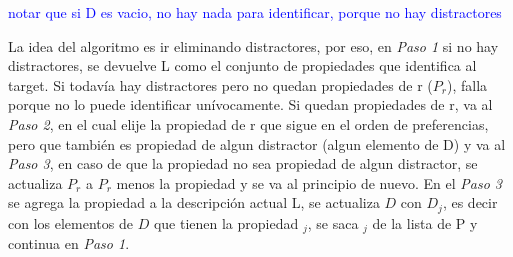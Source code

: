 \textcolor{blue}{notar que si D es vacio, no hay nada para identificar, porque no hay distractores}

La idea del algoritmo es ir eliminando distractores, por eso, en {\it Paso 1} si no hay distractores, se devuelve L como el conjunto de propiedades que identifica al target. Si todav\'ia hay distractores pero no quedan propiedades de r ($P_{r}$), falla porque no lo puede identificar un\'ivocamente. Si quedan propiedades de r, va al {\it Paso 2}, en el cual elije la propiedad de r que sigue en el orden de preferencias, pero que tambi\'en es propiedad de algun distractor (algun elemento de D) y va al {\it Paso 3}, en caso de que la propiedad no sea propiedad de algun distractor, se actualiza $P_{r}$ a $P_{r}$ menos la propiedad y se va al principio de nuevo.
En el {\it Paso 3} se agrega la propiedad a la descripci\'on actual L, se actualiza $D$ con $D_{j}$, es decir con los elementos de $D$ que tienen la propiedad $_j$, se saca $_j$ de la lista de P y continua en {\it Paso 1}.\\

